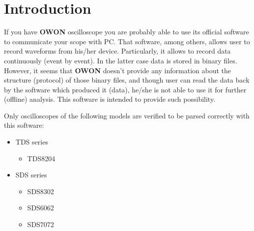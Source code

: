 \section{Introduction}\label{sec:intro}
If you have \textbf{OWON} oscilloscope you are probably able to use its official software
to communicate your scope with PC. That software, among others, allows user to record
waveforms from his/her device. Particularly, it allows to record data continuously (event
by event). In the latter case data is stored in binary files. However, it seems that
\textbf{OWON} doesn't provide any information about the structure (protocol) of those
binary files, and though user can read the data back by the software which produced it
(data), he/she is not able to use it for further (offline) analysis.
This software is intended to provide such possibility.


Only oscilloscopes of the following models are verified to be parsed correctly with
this software:
\begin{itemize}
    \item TDS series
        \begin{itemize}
            \item TDS8204
        \end{itemize}
    \item SDS series
        \begin{itemize}
            \item SDS8302
            \item SDS6062
            \item SDS7072
        \end{itemize}
\end{itemize}


